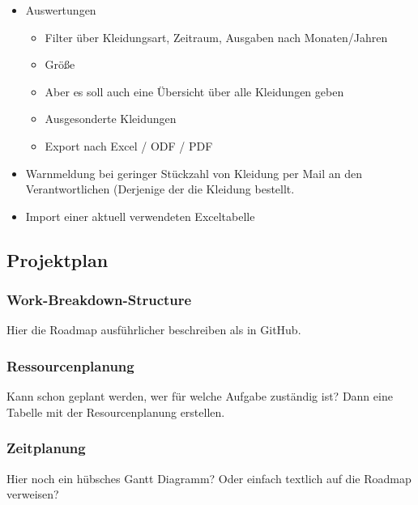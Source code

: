\begin{itemize}
\begin{itemize}
  \end{itemize}
\item Auswertungen
  \begin{itemize}
  \item Filter über Kleidungsart, Zeitraum, Ausgaben nach Monaten/Jahren
  \item Größe
  \item Aber es soll auch eine Übersicht über alle Kleidungen geben
  \item Ausgesonderte Kleidungen
  \item Export nach Excel / ODF / PDF
  \end{itemize}
\item Warnmeldung bei geringer Stückzahl von Kleidung per Mail an den Verantwortlichen (Derjenige der die Kleidung bestellt.
\item Import einer aktuell verwendeten Exceltabelle
\end{itemize}


\subsection{Projektplan}
\subsubsection{Work-Breakdown-Structure}\label{sec:wbs}

Hier die Roadmap ausführlicher beschreiben als in GitHub.


\subsubsection{Ressourcenplanung}

Kann schon geplant werden, wer für welche Aufgabe zuständig ist? Dann eine Tabelle mit der Resourcenplanung erstellen.

\subsubsection{Zeitplanung}

Hier noch ein hübsches Gantt Diagramm? Oder einfach textlich auf die Roadmap verweisen?